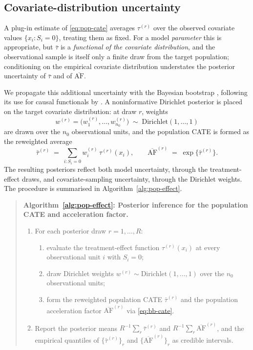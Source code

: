 \documentclass[11pt]{report}
\theoremstyle{plain}
\theoremstyle{definition}
\theoremstyle{remark}
\newcommand{\1}{\mathds{1}}
\theoremstyle{plain}
\theoremstyle{remark}
\newcommand{\af}{\mathrm{AF}}
\begin{document}
\subsection{Covariate-distribution uncertainty}

A plug-in estimate of \eqref{eq:pop-cate} averages $\tau^{(r)}$ over the observed
covariate values $\{x_i : S_i = 0\}$, treating them as fixed. For a model
\emph{parameter} this is appropriate, but $\bar\tau$ is a \emph{functional of the
covariate distribution}, and the observational sample is itself only a finite
draw from the target population; conditioning on the empirical covariate
distribution understates the posterior uncertainty of $\bar\tau$ and of
$\overline{\af}$.

We propagate this additional uncertainty with the Bayesian bootstrap
\citep{Rubin1981}, following its use for causal functionals by
\citet{Antonelli2019}. A noninformative Dirichlet posterior is placed on the
target covariate distribution: at draw $r$, weights
\[
w^{(r)} = \bigl(w_1^{(r)}, \dots, w_{n_0}^{(r)}\bigr)
\;\sim\; \mathrm{Dirichlet}(1, \dots, 1)
\]
are drawn over the $n_0$ observational units, and the population CATE is formed
as the reweighted average
\begin{equation}
\label{eq:bb-cate}
\bar\tau^{(r)} \;=\; \sum_{i : S_i = 0} w_i^{(r)}\, \tau^{(r)}(x_i),
\qquad
\overline{\af}^{(r)} \;=\; \exp\{\bar\tau^{(r)}\}.
\end{equation}
The resulting posteriors reflect both model uncertainty, through the
treatment-effect draws, and covariate-sampling uncertainty, through the
Dirichlet weights. The procedure is summarised in
Algorithm~\ref{alg:pop-effect}.

\begin{quote}
\noindent\textbf{Algorithm~\ref{alg:pop-effect}: Posterior inference for the
population CATE and acceleration factor.}\label{alg:pop-effect}
\begin{enumerate}[label=\textup{(\arabic*)},leftmargin=2.4em]
\item For each posterior draw $r = 1, \dots, R$:
  \begin{enumerate}[label=\textup{(\alph*)},leftmargin=2.0em]
  \item evaluate the treatment-effect function $\tau^{(r)}(x_i)$ at every
        observational unit $i$ with $S_i = 0$;
  \item draw Dirichlet weights $w^{(r)} \sim \mathrm{Dirichlet}(1,\dots,1)$
        over the $n_0$ observational units;
  \item form the reweighted population CATE $\bar\tau^{(r)}$ and the population
        acceleration factor $\overline{\af}^{(r)}$ via \eqref{eq:bb-cate}.
  \end{enumerate}
\item Report the posterior means $R^{-1}\sum_r \bar\tau^{(r)}$ and
      $R^{-1}\sum_r \overline{\af}^{(r)}$, and the empirical quantiles of
      $\{\bar\tau^{(r)}\}_r$ and $\{\overline{\af}^{(r)}\}_r$ as credible
      intervals.
\end{enumerate}
\end{quote}
\end{document}
